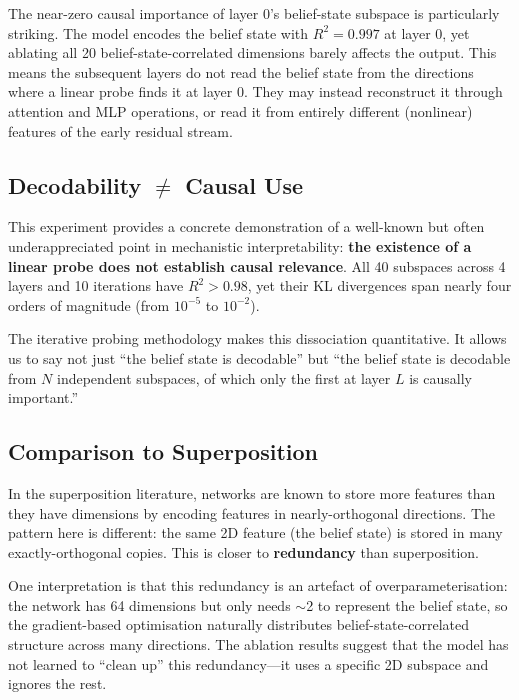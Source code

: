\documentclass[11pt]{article}
\begin{document}
The near-zero causal importance of layer 0's belief-state subspace is particularly striking.  The model encodes the belief state with $R^2 = 0.997$ at layer 0, yet ablating all 20 belief-state-correlated dimensions barely affects the output.  This means the subsequent layers do not read the belief state from the directions where a linear probe finds it at layer 0.  They may instead reconstruct it through attention and MLP operations, or read it from entirely different (nonlinear) features of the early residual stream.

\subsection{Decodability $\neq$ Causal Use}

This experiment provides a concrete demonstration of a well-known but often underappreciated point in mechanistic interpretability: \textbf{the existence of a linear probe does not establish causal relevance}.  All 40 subspaces across 4 layers and 10 iterations have $R^2 > 0.98$, yet their KL divergences span nearly four orders of magnitude (from $10^{-5}$ to $10^{-2}$).

The iterative probing methodology makes this dissociation quantitative.  It allows us to say not just ``the belief state is decodable'' but ``the belief state is decodable from $N$ independent subspaces, of which only the first at layer $L$ is causally important.''

\subsection{Comparison to Superposition}

In the superposition literature, networks are known to store more features than they have dimensions by encoding features in nearly-orthogonal directions.  The pattern here is different: the same 2D feature (the belief state) is stored in many exactly-orthogonal copies.  This is closer to \textbf{redundancy} than superposition.

One interpretation is that this redundancy is an artefact of overparameterisation: the network has 64 dimensions but only needs $\sim$2 to represent the belief state, so the gradient-based optimisation naturally distributes belief-state-correlated structure across many directions.  The ablation results suggest that the model has not learned to ``clean up'' this redundancy---it uses a specific 2D subspace and ignores the rest.
\end{document}
